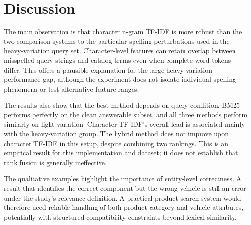 \documentclass[11pt,a4paper]{article}
\begin{document}
\section{Discussion}
The main observation is that character n-gram TF-IDF is more robust than the two comparison systems to the particular spelling perturbations used in the heavy-variation query set. Character-level features can retain overlap between misspelled query strings and catalog terms even when complete word tokens differ. This offers a plausible explanation for the large heavy-variation performance gap, although the experiment does not isolate individual spelling phenomena or test alternative feature ranges.

The results also show that the best method depends on query condition. BM25 performs perfectly on the clean answerable subset, and all three methods perform similarly on light variation. Character TF-IDF's overall lead is associated mainly with the heavy-variation group. The hybrid method does not improve upon character TF-IDF in this setup, despite combining two rankings. This is an empirical result for this implementation and dataset; it does not establish that rank fusion is generally ineffective.

The qualitative examples highlight the importance of entity-level correctness. A result that identifies the correct component but the wrong vehicle is still an error under the study's relevance definition. A practical product-search system would therefore need reliable handling of both product-category and vehicle attributes, potentially with structured compatibility constraints beyond lexical similarity.
\end{document}
